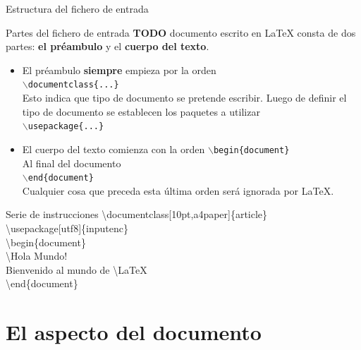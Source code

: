 \begin{frame}{Estructura del fichero de entrada}
    \begin{block}{Partes del fichero de entrada}
        \textbf{TODO} documento escrito en \LaTeX{} consta de dos partes: \textbf{el pr\'eambulo} y el \textbf{cuerpo del texto}.
        \begin{itemize}
            \item El pr\'eambulo \textbf{siempre} empieza por la orden \\
                \texttt{$\backslash$documentclass\{...\}} \\
                Esto indica que tipo de documento se pretende escribir. 
                Luego de definir el tipo de documento se establecen los paquetes a utilizar \\
                \texttt{$\backslash$usepackage\{...\}}
            \item El cuerpo del texto comienza con la orden
                \texttt{$\backslash$begin\{document\}} \\
                Al final del documento \\
                \texttt{$\backslash$end\{document\}}\\
                Cualquier cosa que preceda esta última orden será ignorada por \LaTeX{}.
        \end{itemize}
    \end{block}
\end{frame}

\begin{frame}
    \begin{block}{Serie de instrucciones}
        \textbackslash documentclass[10pt,a4paper]\{article\} \\
        \textbackslash usepackage[utf8]\{inputenc\} \\
        \textbackslash begin\{document\} \\
        \textbackslash Hola Mundo!\\
        Bienvenido al mundo de \textbackslash LaTeX \\
        \textbackslash end\{document\}
    \end{block}
\end{frame}

\section{El aspecto del documento}

